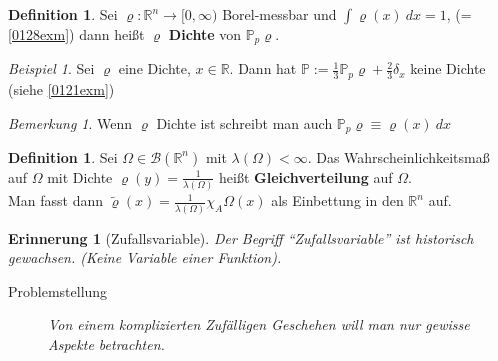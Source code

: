 \documentclass[10pt,a4paper]{article}
\newcommand{\R}{\ensuremath{\mathbb{R}}}
\newcommand{\la}{\ensuremath{\lambda}}
\newcommand{\Bor}{\mathscr B}
\newcommand{\Prb}{\mathbb P}
\theoremstyle{plain}
\newtheorem*{rem*}{Erinnerung}
\theoremstyle{definition}
\newtheorem{definition}[theorem]{Definition}
\theoremstyle{remark}
\newtheorem*{bem*}{Bemerkung}
\newtheorem{exm}[theorem]{Beispiel}
\begin{document}
	\begin{definition}
		Sei $\varrho:\R^n\to[0,\infty)$ Borel-messbar und $\int\varrho(x)~dx=1$, (=\ref{0128exm}) dann heißt $\varrho$ \textbf{Dichte} von $\Prb_p\varrho$.
	\end{definition}

	\begin{exm}
		Sei $\varrho$ eine Dichte, $x\in\R$. Dann hat $\Prb:=\frac{1}{3}\Prb_p\varrho+\frac{2}{3}\delta_x$ keine Dichte (siehe \ref{0121exm})
	\end{exm}

	\begin{bem*}
		Wenn $\varrho$ Dichte ist schreibt man auch $\Prb_p\varrho\equiv\varrho(x)~dx$
	\end{bem*}

	\begin{definition}
		Sei $\Omega\in\Bor(\R^n)$ mit $\la(\Omega)<\infty$. Das Wahrscheinlichkeitsmaß auf $\Omega$ mit Dichte $\varrho(y)=\frac{1}{\la(\Omega)}$ heißt \textbf{Gleichverteilung} auf $\Omega$.\\
		Man fasst dann $\tilde\varrho(x)=\frac{1}{\la(\Omega)}\chi_A\Omega(x)$ als Einbettung in den $\R^n$ auf.
	\end{definition}

	\begin{rem*}[Zufallsvariable]
		Der Begriff \enquote{Zufallsvariable} ist historisch gewachsen. (Keine Variable einer Funktion).
		\begin{description}
			\item[Problemstellung] Von einem komplizierten Zufälligen Geschehen will man nur gewisse Aspekte betrachten.
		\end{description}
	\end{rem*}
\end{document}
